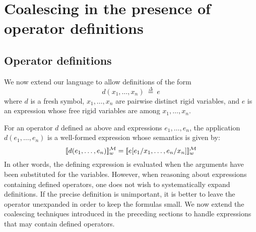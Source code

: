 \documentclass{easychair}
\newcommand{\tlaplus}{\mbox{TLA\kern -.35ex$^+$}\xspace}
\newcommand{\sem}[1]{\ensuremath{[\![ #1 ]\!]}}
\newcommand{\MM}{\mathcal{M}}
\def\llnote{\ednote{LL}}
\let\notla\relax
\newcommand{\deq}{\mathrel{\stackrel{\scriptscriptstyle\Delta}{=}}}
\def\E{\exists\,}
\begin{document}
\section{Coalescing in the presence of operator definitions}
\label{sec:leibnizing}

\subsection{Operator definitions}
\label{sec:definitions}

We now extend our language to allow definitions of the form
\[
  d(x_1,\ldots,x_n)\ \deq\ e
\]
where $d$ is a fresh symbol,
$x_1,\ldots,x_n$ are pairwise distinct rigid
variables, and $e$ is an expression whose free rigid variables are among
$x_1,\ldots,x_n$.


For an operator $d$ defined as above and expressions $e_1,\ldots,e_n$, the
application $d(e_1,\ldots,e_n)$ is a well-formed expression whose semantics is
given by:
\[\notla
  \sem{d(e_1,\ldots,e_n)}^{\MM}_w =
  \sem{e[e_1/x_1, \ldots, e_n/x_n]}^{\MM}_w
\] In other words, the defining expression is evaluated when the
arguments have been substituted for the variables.  However, when
reasoning about expressions containing defined operators, one does not
wish to systematically expand definitions.  If the precise definition
is unimportant, it is better to leave the operator unexpanded in order
to keep the formulas small.  We now extend the coalescing techniques
introduced in the preceding sections to handle expressions that may
contain defined operators.
\end{document}

